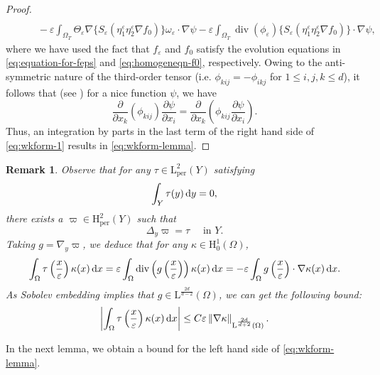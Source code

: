 \documentclass[preprint, 12pt]{amsart}
\numberwithin{equation}{section}
\newtheorem{remark}[theorem]{Remark}        %
\numberwithin{equation}{section}
\newcommand{\eps}{\varepsilon}
\DeclareMathOperator{\dv}{div}
\begin{document}
\begin{proof}
\begin{equation}
\begin{aligned}
\\
& \qquad - \eps \int_{\Omega_T} \Theta_\eps \nabla \bigg\{S_{\varepsilon}(\eta_1^\eps \eta_2^\eps \nabla f_0)\bigg\}\omega_\eps \cdot \nabla \psi
- \eps \int_{\Omega_T} \dv \left(\phi_\eps\right) \bigg\{S_{\varepsilon}(\eta_1^\eps \eta_2^\eps \nabla f_0)\bigg\} \cdot \nabla \psi,
\end{aligned}
\end{equation}
where we have used the fact that $f_\eps$ and $f_0$ satisfy the evolution equations in \eqref{eq:equation-for-feps} and \eqref{eq:homogeneqn-f0}, respectively. Owing to the anti-symmetric nature of the third-order tensor (i.e. $\phi_{kij} = - \phi_{ikj}$ for $1\le i,j,k \le d$), it follows that (see \cite[Remark 3.1.3]{shen2018periodic}) for a nice function $\psi$, we have
\[
\frac{\partial}{\partial x_k} \left( \phi_{kij} \right) \frac{\partial \psi}{\partial x_i} = \frac{\partial}{\partial x_k} \left( \phi_{kij} \frac{\partial \psi}{\partial x_i} \right).
\]
Thus, an integration by parts in the last term of the right hand side of \eqref{eq:wkform-1} results in \eqref{eq:wkform-lemma}.
\end{proof}
\begin{remark}\label{rem:zero-avg-periodic}
Observe that for any $\tau\in\mathrm L^2_{\textrm{per}}(Y)$ satisfying 
\[
\int_Y\tau(y)\, {\rm d}y = 0,
\]
there exists a $\varpi\in \mathrm H^2_{\text{per}}(Y)$ such that
\[
\Delta_y \varpi = \tau \quad \mbox{ in }Y.
\]
Taking $g=\nabla_y \varpi$, we deduce that for any $\kappa\in \mathrm H^1_0(\Omega)$,
\[
\int_\Omega \tau\left(\frac{x}{\eps}\right) \kappa(x)\, {\rm d}x
= \eps \int_\Omega \dv\left(g\left(\frac{x}{\eps}\right)\right) \kappa(x) \, {\rm d}x
= - \eps \int_\Omega g\left(\frac{x}{\eps}\right) \cdot \nabla \kappa(x)\, {\rm d}x.
\]
As Sobolev embedding implies that $g\in \mathrm L^{\frac{2d}{d-2}}(\Omega)$, we can get the following bound:
\begin{equation}\label{eq:bound-rmk}
\left\vert \int_\Omega \tau\left(\frac{x}{\eps}\right) \kappa(x)\, {\rm d}x \right\vert 
\le C \eps \left\Vert \nabla \kappa\right\Vert_{\mathrm L^{\frac{2d}{d+2}}(\Omega)}.
\end{equation}
\end{remark}
In the next lemma, we obtain a bound for the left hand side of \eqref{eq:wkform-lemma}.
\end{document}
